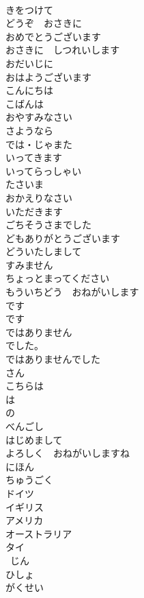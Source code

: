 \documentclass[8pt]{extreport}
\begin{document}
\begin{CJK}{UTF8}{min}
\\	きをつけて	
\\	どうぞ　おさきに		
\\	おめでとうございます		
\\	おさきに　しつれいします	
\\	おだいじに	
\\	おはようございます		
\\	こんにちは		
\\	こばんは		
\\	おやすみなさい		
\\	さようなら		
\\	では・じゃまた		
\\	いってきます	
\\	いってらっしゃい	
\\	たさいま		
\\	おかえりなさい		
\\	いただきます	
\\	ごちそうさまでした		
\\	どもありがとうございます		
\\	どういたしまして		
\\	すみません		
\\	ちょっとまってください		
\\	もういちどう　おねがいします		
\\	です		
\\	です		
\\	ではありません		
\\	でした。		
\\	ではありませんでした		
\\	さん		
\\	こちらは		
\\	は		
\\	の		
\\	べんごし		
\\	はじめまして		
\\	よろしく　おねがいしますね		
\\	にほん		
\\	ちゅうごく		
\\	ドイツ		
\\	イギリス		
\\	アメリカ		
\\	オーストラリア		
\\	タイ		
\\	~じん		
\\	ひしょ		
\\	がくせい		

\end{CJK}
\end{document}
